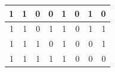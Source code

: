 \documentclass[11pt,UTF8]{ctexart}
\def\midrule{\hline}
\def\bottomrule{\hline}
\begin{document}
\begin{table}[htbp]
\begin{tabular}{|r|r|r|r|r|r|r|r|}
    \midrule
    1     & 1     & 0     & 0     & \textcolor[rgb]{ 1,  0,  0}{1} & 0     & \textcolor[rgb]{ 1,  0,  0}{1} & 0 \\
    \midrule
    1     & 1     & 0     & 1     & \textcolor[rgb]{ 1,  0,  0}{1} & 0     & \textcolor[rgb]{ 1,  0,  0}{1} & \textcolor[rgb]{ 1,  0,  0}{1} \\
    \midrule
    1     & 1     & 1     & 0     & \textcolor[rgb]{ 1,  0,  0}{1} & 0     & 0     & \textcolor[rgb]{ 1,  0,  0}{1} \\
    \midrule
    1     & 1     & 1     & 1     & \textcolor[rgb]{ 1,  0,  0}{1} & 0     & 0     & 0 \\
    \bottomrule
    \end{tabular}%
  \label{tab:addlabel}%
\end{table}%
\end{document}
